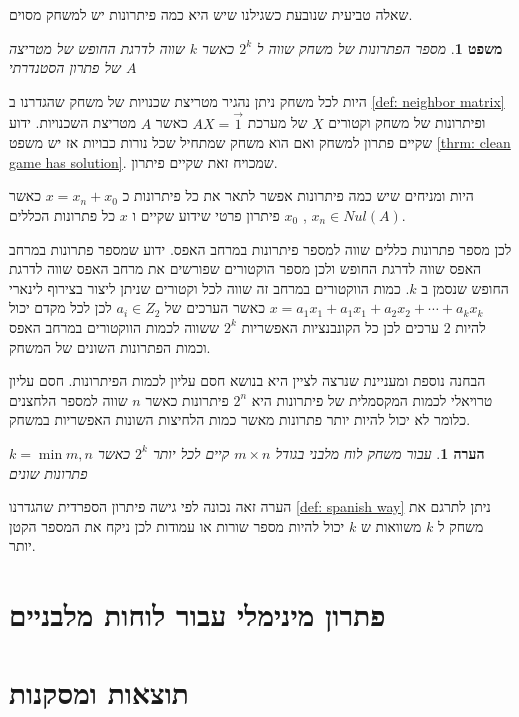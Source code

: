 \documentclass[12pt,twoside]{article}
\newtheorem{theorem}{משפט}[section]
\newtheorem{comm}{הערה}[section]
\begin{document}
שאלה טביעית שנובעת כשגילנו שיש היא כמה פיתרונות יש למשחק מסוים.

\begin{theorem}
    מספר הפתרונות של משחק 
    שווה ל 
    $2^{k}$
    כאשר 
    $k$
    שווה לדרגת החופש של מטריצה
    $A$
    של פתרון הסטנדרתי
\end{theorem}

היות לכל משחק ניתן נהגיר מטריצת שכנויות של משחק שהגדרנו 
ב
\ref{def: neighbor matrix}
ופיתרונות של משחק וקטורים
$X$
של מערכת
$A X = \vec{1}$
כאשר 
$A$
מטריצת השכנויות.
ידוע שקיים פתרון למשחק ואם הוא משחק שמתחיל שכל נורות כבויות אז יש משפט 
\ref{thrm: clean game has solution}.
שמכויח זאת שקיים פיתרון.

היות ומניחים שיש כמה פיתרונות אפשר לתאר את כל פיתרונות כ
$x = x_n + x_0$
כאשר 
$x_n \in Nul(A)$ ,
$x_0$ 
פיתרון פרטי שידוע שקיים 
ו
$x$
כל פתרונות הכללים.

לכן מספר פתרונות כללים שווה למספר פיתרונות במרחב האפס.
ידוע שמספר פתרונות במרחב האפס שווה לדרגת החופש ולכן מספר הוקטורים שפורשים
את מרחב האפס שווה לדרגת החופש שנסמן ב
$k$.
כמות הווקטורים במרחב זה שווה לכל וקטורים שניתן ליצור בצירוף לינארי 
$x = a_1 x_1 + a_1 x_1 + a_2 x_2 + \cdots + a_k x_k$
כאשר הערכים של
$a_i \in Z_2$
לכן 
לכל מקדם יכול להיות
$2$
ערכים
לכן כל הקונבנציות האפשריות 
$2^k$
ששווה
לכמות הווקטורים 
במרחב האפס וכמות הפתרונות השונים של המשחק.

הבחנה נוספת ומעניינת שנרצה לציין היא בנושא חסם עליון לכמות הפיתרונות.
חסם עליון טרויאלי לכמות המקסמלית של פיתרונות היא 
$2^n$
פיתרונות כאשר
$n$
שווה למספר הלחצנים כלומר לא יכול להיות יותר פתרונות מאשר כמות הלחיצות השונות האפשריות במשחק.

\begin{comm}
    עבור משחק לוח מלבני
    בגודל 
    $m \times n$
    קיים לכל יותר 
    $2^k$
    כאשר 
    $k = \min{m,n}$
    פתרונות שונים
\end{comm}
הערה זאה נכונה לפי גישה פיתרון הספרדית
שהגדרנו
\ref{def: spanish way}
ניתן לתרגם את משחק ל
$k$
משוואות 
ש
$k$
יכול להיות מספר שורות או עמודות 
לכן ניקח את המספר הקטן יותר.

\section{פתרון מינימלי עבור לוחות מלבניים}



\section{תוצאות ומסקנות}
\end{document}
